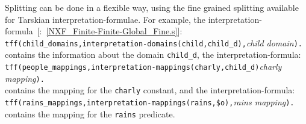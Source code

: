 \documentclass{easychair}
\newcommand{\smalltt}[1]{\small \texttt{#1}}
\newcommand{\example}{{\scriptsize \faFile[regular]}}
\begin{document}
Splitting can be done in a flexible way, using the fine grained splitting available for
Tarskian interpretation-formulae.
For example, the interpretation-formula~[\example{}:~\ref{NXF_Finite-Finite-Global_Fine.s}]: \\
\hspace*{0.5cm}\smalltt{tff(child\_domains,interpretation-domains(child,child\_d),}\emph{child domain}\smalltt{).} \\
contains the information about the domain \smalltt{child\_d}, the interpretation-formula: \\
\hspace*{0.5cm}\smalltt{tff(people\_mappings,interpretation-mappings(charly,child\_d)}\emph{charly mapping}\smalltt{).} \\
contains the mapping for the \smalltt{charly} constant, and the interpretation-formula: \\
\hspace*{0.5cm}\smalltt{tff(rains\_mappings,interpretation-mappings(rains,\$o),}\emph{rains mapping}\smalltt{).} \\
contains the mapping for the \smalltt{rains} predicate.
\end{document}
